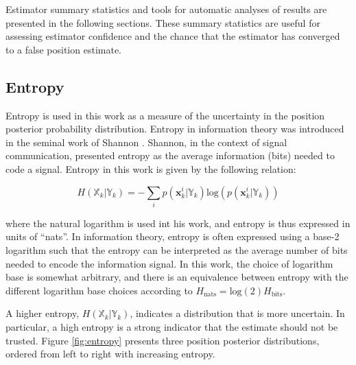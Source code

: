 Estimator summary statistics and tools for automatic analyses of results are presented in the following sections.  
These summary statistics are useful for assessing estimator confidence and the chance that the estimator has converged to a false position estimate.

\subsection{Entropy}
\label{framework.Statistics.Entropy}

Entropy is used in this work as a measure of the uncertainty in the position posterior probability distribution.
Entropy in information theory was introduced in the seminal work of Shannon \cite{shannon1948mathematical}.
Shannon, in the context of signal communication, presented entropy as the average information (bits) needed to code a signal.
Entropy in this work is given by the following relation:

\begin{equation}
H(\mathbb{X}_k | \mathbb{Y}_k) = - \sum_i p(\mathbf{x}_k^{i} | \mathbb{Y}_k) \text{log} ( p(\mathbf{x}_k^{i} | \mathbb{Y}_k) )
\label{eq:entropy}
\end{equation}

\noindent where the natural logarithm is used int his work, and entropy is thus expressed in units of ``nats''.  
In information theory, entropy is often expressed using a base-2 logarithm such that the entropy can be interpreted as the average number of bits needed to encode the information signal.
In this work, the choice of logarithm base is somewhat arbitrary, and there is an equivalence between entropy with the different logarithm base choices according to $H_{\text{nats}} = \text{log}(2) H_{\text{bits}}$.

A higher entropy, $H(\mathbb{X}_k | \mathbb{Y}_k)$, indicates a distribution that is more uncertain.
In particular, a high entropy is a strong indicator that the estimate should not be trusted.
Figure \ref{fig:entropy} presents three position posterior distributions, ordered from left to right with increasing entropy.

